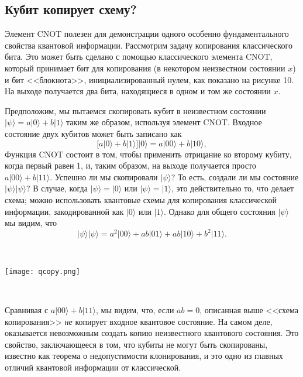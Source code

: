 \begin{multicols}{2}
    \section*{Кубит копирует схему?}
    \normalsize{
        Элемент CNOT полезен для демонстрации одного особенно фундаментального свойства
        квантовой информации. Рассмотрим задачу копирования классического бита. Это может быть сделано
        с помощью классического элемента CNOT, который принимает бит для копирования (в некотором неизвестном состоянии $x$)
        и бит <<блокнота>>, инициализированный нулем, как показано на рисунке 10. На выходе получается два
        бита, находящиеся в одном и том же состоянии $x$.

        Предположим, мы пытаемся скопировать кубит в неизвестном состоянии $\vert\psi\rangle=a \vert0\rangle+b \vert1\rangle$ таким же
        образом, используя элемент CNOT. Входное состояние двух кубитов может быть записано как
        \begin{equation}
            \big[a\vert0\rangle+b\vert1\rangle\big]\vert0\rangle=a\vert00\rangle+b\vert10\rangle,
        \end{equation}
        Функция CNOT состоит в том, чтобы применить отрицание ко второму кубиту, когда первый равен 1, и, таким образом, 
        на выходе получается просто $a\vert00\rangle+b\vert11\rangle$. Успешно ли мы скопировали $\vert\psi\rangle$? 
        То есть, создали ли мы состояние $\vert\psi\rangle\vert\psi\rangle$? В случае, когда $\vert\psi\rangle=\vert0\rangle$ или $\vert\psi\rangle=\vert1\rangle$, это действительно то, что делает 
        схема; можно использовать квантовые схемы для копирования классической информации, закодированной как $\vert0\rangle$ или $\vert1\rangle$.  Однако для общего состояния $\vert\psi\rangle$ мы видим, что
        \begin{equation}
            \vert\psi\rangle\vert\psi\rangle=a^2\vert00\rangle+ab\vert01\rangle+ab\vert10\rangle+b^2\vert11\rangle.
        \end{equation}
    }\\
    \begin{flushleft}
        \begin{minipage}{0.3\textwidth}{\texttt{[image: qcopy.png]}}
        \end{minipage}\\
        \vspace{0.3cm}
    \end{flushleft}
    \normalsize{
        Сравнивая с $a\vert00\rangle+b\vert11\rangle$, мы видим, что, если $ab = 0$, описанная выше <<схема копирования>> 
        \emph{не} копирует входное квантовое состояние. На самом деле, оказывается невозможным создать копию
        неизвестного квантового состояния. Это свойство, заключающееся в том, что кубиты не могут быть скопированы, известно
        как теорема о недопустимости клонирования, и это одно из главных отличий квантовой
        информации от классической.

}
\end{multicols}
